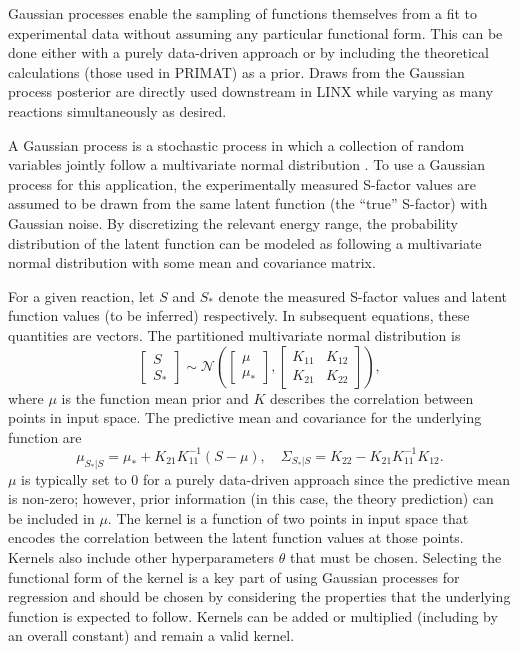 \documentclass[%
 reprint,
superscriptaddress,
nofootinbib,
 amsmath,amssymb,
 aps,
 pra,
]{revtex4-2}
\begin{document}
Gaussian processes enable the sampling of functions themselves from a fit to experimental data without assuming any particular functional form. This can be done either with a purely data-driven approach or by including the theoretical calculations (those used in PRIMAT) as a prior. Draws from the Gaussian process posterior are directly used downstream in LINX while varying as many reactions simultaneously as desired. 

A Gaussian process is a stochastic process in which a collection of random variables jointly follow a multivariate normal distribution \cite{Rasmussen2006}. To use a Gaussian process for this application, the experimentally measured S-factor values are assumed to be drawn from the same latent function (the ``true'' S-factor) with Gaussian noise. By discretizing the relevant energy range, the probability distribution of the latent function can be modeled as following a multivariate normal distribution with some mean and covariance matrix.

For a given reaction, let $S$ and $S_*$ denote the measured S-factor values and latent function values (to be inferred) respectively. In subsequent equations, these quantities are vectors. The partitioned multivariate normal distribution is 
\begin{equation}
	\begin{bmatrix}
   		S \\ S_*
	\end{bmatrix} \sim \mathcal{N} \left( 
	\begin{bmatrix}
    		\mu \\ \mu_*
	\end{bmatrix} , \begin{bmatrix}
    		K_{11} & K_{12} \\ K_{21} & K_{22}
	\end{bmatrix} \right),
\end{equation}
where $\mu$ is the function mean prior and $K$ describes the correlation between points in input space. The predictive mean and covariance for the underlying function are \cite{Rasmussen2006}
\begin{equation}
	\mu_{S_* | S} = \mu_* + K_{21} K_{11}^{-1}(S - \mu), \quad \Sigma_{S_* | S} = K_{22} - K_{21} K_{11}^{-1} K_{12}.
\end{equation}
$\mu$ is typically set to 0 for a purely data-driven approach since the predictive mean is non-zero; however, prior information (in this case, the theory prediction) can be included in $\mu$. The kernel is a function of two points in input space that encodes the correlation between the latent function values at those points. Kernels also include other hyperparameters $\theta$ that must be chosen. Selecting the functional form of the kernel is a key part of using Gaussian processes for regression and should be chosen by considering the properties that the underlying function is expected to follow. Kernels can be added or multiplied (including by an overall constant) and remain a valid kernel. 
\end{document}
